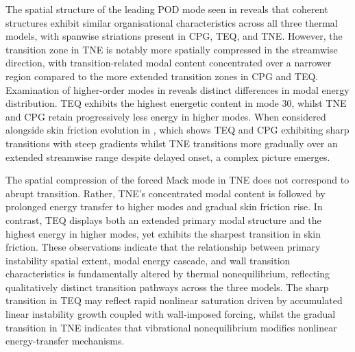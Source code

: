 The spatial structure of the leading \gls{POD} mode seen in  reveals that coherent structures exhibit similar organisational characteristics across all three thermal models, with spanwise striations present in \gls{CPG}, \gls{TEQ}, and \gls{TNE}. However, the transition zone in \gls{TNE} is notably more spatially compressed in the streamwise direction, with transition-related modal content concentrated over a narrower region compared to the more extended transition zones in \gls{CPG} and \gls{TEQ}. Examination of higher-order modes in  reveals distinct differences in modal energy distribution. \gls{TEQ} exhibits the highest energetic content in mode 30, whilst \gls{TNE} and \gls{CPG} retain progressively less energy in higher modes. When considered alongside skin friction evolution in , which shows \gls{TEQ} and \gls{CPG} exhibiting sharp transitions with steep gradients whilst \gls{TNE} transitions more gradually over an extended streamwise range despite delayed onset, a complex picture emerges.

The spatial compression of the forced Mack mode in \gls{TNE} does not correspond to abrupt transition. Rather, \gls{TNE}'s concentrated modal content is followed by prolonged energy transfer to higher modes and gradual skin friction rise. In contrast, \gls{TEQ} displays both an extended primary modal structure and the highest energy in higher modes, yet exhibits the sharpest transition in skin friction. These observations indicate that the relationship between primary instability spatial extent, modal energy cascade, and wall transition characteristics is fundamentally altered by thermal nonequilibrium, reflecting qualitatively distinct transition pathways across the three models. The sharp transition in \gls{TEQ} may reflect rapid nonlinear saturation driven by accumulated linear instability growth coupled with wall-imposed forcing, whilst the gradual transition in \gls{TNE} indicates that vibrational nonequilibrium modifies nonlinear energy-transfer mechanisms.




